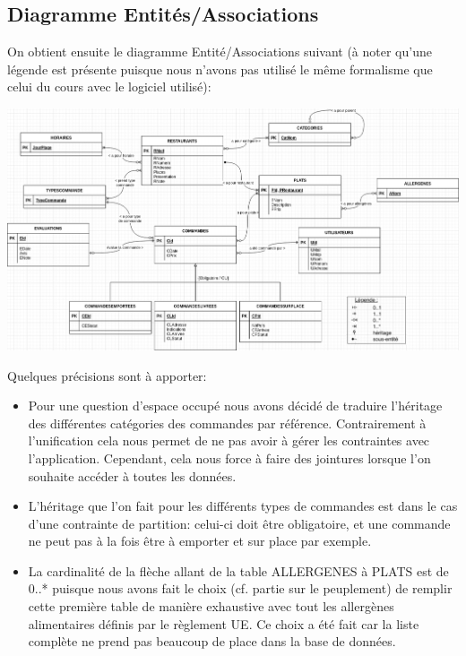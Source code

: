 \documentclass[10pt, a4paper]{article}
\begin{document}
\begin{landscape}
    \newpage
    \subsection{Diagramme Entités/Associations}
    On obtient ensuite le diagramme Entité/Associations suivant (à noter qu'une légende est présente puisque nous n'avons pas utilisé le même formalisme que celui du cours avec le logiciel utilisé):
    \begin{center}
        \includegraphics[scale=0.45]{Diagramme_entite_relation.png}\\
    \end{center}

\end{landscape}

Quelques précisions sont à apporter:

\begin{itemize}
    \item Pour une question d'espace occupé nous avons décidé de traduire l'héritage des différentes catégories des commandes par référence. Contrairement à l'unification cela nous permet de ne pas avoir à gérer les contraintes avec l'application. Cependant, cela nous force à faire des jointures lorsque l'on souhaite accéder à toutes les données.
    \item L'héritage que l'on fait pour les différents types de commandes est dans le cas d'une contrainte de partition: celui-ci doit être obligatoire, et une commande ne peut pas à la fois être à emporter et sur place par exemple.
    \item La cardinalité de la flèche allant de la table ALLERGENES à PLATS est de 0..* puisque nous avons fait le choix (cf. partie sur le peuplement) de remplir cette première table de manière exhaustive avec tout les allergènes alimentaires définis par le règlement UE. Ce choix a été fait car la liste complète ne prend pas beaucoup de place dans la base de données.

\end{itemize}
\end{document}
